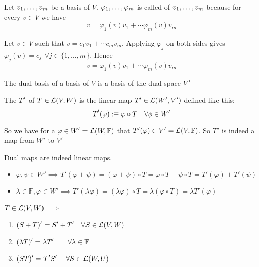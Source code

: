 \setcounter{thm}{113}
\begin{thm}
  Let $v_1, \dots, v_m$ be a basis of $V$. $\varphi_1, \dots, \varphi_m$ is called  of $v_1, \dots, v_m$ because for every $v \in V$ we have 
  \begin{equation}
    v=\varphi_1 (v)v_1 + \cdots \varphi_m(v)v_m
  \end{equation}
\end{thm}
\begin{prf}
  Let $v \in V$ such that $v= c_1v_1 + \cdots c_mv_m$. Applying
  $\varphi_j$ on both sides gives $\varphi_j(v)=c_j$ $\forall j\in \{1, \dots, m\}$. Hence
  \begin{equation}
  v=\varphi_1 (v)v_1 + \cdots \varphi_m(v)v_m
  \end{equation}
\end{prf}

\setcounter{thm}{115}
\begin{thm}
  The dual basis of a basis of $V$ is a basis of the dual space $\dual{V}$
\end{thm}

\setcounter{thm}{117}
\begin{mydef}
  The  $\dual{T}$ of $T \in \mathcal{L}(V,W)$ is the linear map $T' \in {\mathcal{L}(W', V')}$ defined like this:
\begin{equation}
    \dual{T}(\varphi) :\equiv \varphi \circ T \quad \forall \phi \in W'
\end{equation}

    So we have for a $\varphi \in \dual{W}=\lin{W}{\mathbb{F}}$ that $T'(\varphi) \in V' = {\mathcal{L}(V, \mathbb{F})}$. So $T'$ is indeed a map from $W'$ to $V'$

    Dual maps are indeed linear maps. 
\begin{itemize}
      \item $\varphi, \psi \in W' \implies T' (\varphi + \psi) = (\varphi + \psi) \circ T = \varphi \circ T + \psi \circ T = T' (\varphi) + T'(\psi)$
    \item $\lambda \in \mathbb{F}, \varphi \in W' \implies T' (\lambda \varphi) = (\lambda \varphi) \circ T = \lambda (\varphi \circ T) = \lambda T' (\varphi)$
\end{itemize}


\end{mydef}

\setcounter{thm}{119}
\begin{thm} 
  \label{algebraic-properties-of-dual-maps}
  $T \in \mathcal{L}(V,W)$ $\implies$
  \begin{enumerate}
    \item $\dual{(S+T)} = \dual{S} + \dual{T} \quad \forall S \in \linmap(V,W)$
    \item $\dual{(\lambda T)} = \lambda \dual{T} \quad \quad \forall \lambda \in \myF$
    \item $\dual{(ST)} = \dual{T}\dual{S} \quad \; \forall S \in \linmap (W,U)$
  \end{enumerate}
\end{thm}



